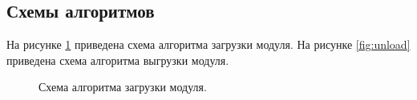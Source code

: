 \documentclass[a4paper,14pt]{article}
\begin{document}
\subsection{Схемы алгоритмов}

На рисунке \ref{fig:load} приведена схема алгоритма загрузки модуля. На рисунке \ref{fig:unload} приведена схема алгоритма выгрузки модуля. 

\newpage
\begin{figure}[!h]
    \caption{Схема алгоритма загрузки модуля.}
    \label{fig:load}
\end{figure}
\end{document}
